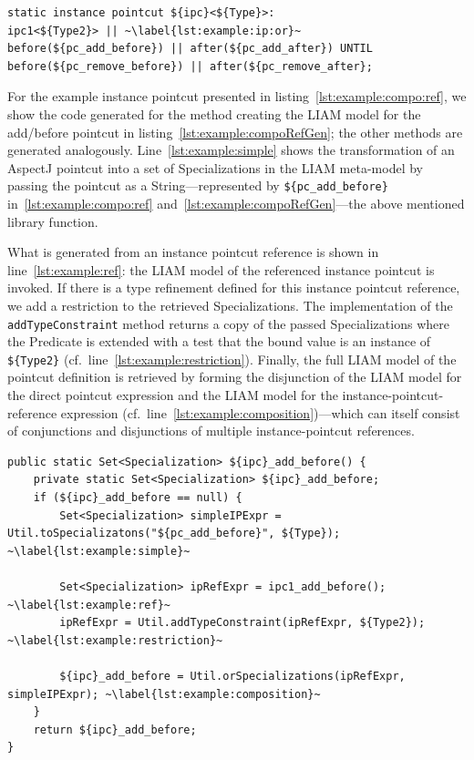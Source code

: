 \documentclass{acm_proc_article-sp}
\begin{document}
\begin{lstlisting}[float,caption={Example of an instance pointcut using composition and type refinement}, label=lst:example:compo:ref,moreemph=instance]
static instance pointcut ${ipc}<${Type}>:
ipc1<${Type2}> || ~\label{lst:example:ip:or}~
before(${pc_add_before}) || after(${pc_add_after}) UNTIL 
before(${pc_remove_before}) || after(${pc_remove_after};
\end{lstlisting}

For the example instance pointcut presented in listing~\ref{lst:example:compo:ref}, we show the code generated for the method creating the LIAM model for the add/before pointcut in listing~\ref{lst:example:compoRefGen}; the other methods are generated analogously.
Line~\ref{lst:example:simple} shows the transformation of an AspectJ pointcut into a set of Specializations in the LIAM meta-model by passing the pointcut as a String---represented by \lstinline!${pc_add_before}! in~\ref{lst:example:compo:ref} and~\ref{lst:example:compoRefGen}---the above mentioned library function.

What is generated from an instance pointcut reference is shown in line~\ref{lst:example:ref}: the LIAM model of the referenced instance pointcut is invoked.
If there is a type refinement defined for this instance pointcut reference, we add a restriction to the retrieved Specializations.
The implementation of the \lstinline!addTypeConstraint! method returns a copy of the passed Specializations where the Predicate is extended with a test that the bound value is an instance of \lstinline!${Type2}! (cf.\ line~\ref{lst:example:restriction}).
Finally, the full LIAM model of the pointcut definition is retrieved by forming the disjunction of the LIAM model for the direct pointcut expression and the LIAM model for the instance-pointcut-reference expression (cf.\ line~\ref{lst:example:composition})---which can itself consist of conjunctions and disjunctions of multiple instance-pointcut references.

\begin{lstlisting}[float,caption={Generated code for creating the LIAM model for the add/before pointcut of the example instance pointcut.},label={lst:example:compoRefGen}]
public static Set<Specialization> ${ipc}_add_before() {
	private static Set<Specialization> ${ipc}_add_before;
	if (${ipc}_add_before == null) {
		Set<Specialization> simpleIPExpr = Util.toSpecializatons("${pc_add_before}", ${Type}); ~\label{lst:example:simple}~
		
		Set<Specialization> ipRefExpr = ipc1_add_before(); ~\label{lst:example:ref}~
		ipRefExpr = Util.addTypeConstraint(ipRefExpr, ${Type2}); ~\label{lst:example:restriction}~
		
		${ipc}_add_before = Util.orSpecializations(ipRefExpr, simpleIPExpr); ~\label{lst:example:composition}~
	}
	return ${ipc}_add_before;
}
\end{lstlisting}
\end{document}
